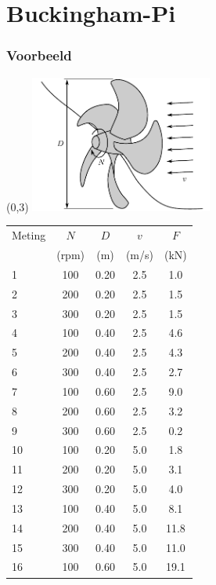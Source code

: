 \documentclass[t]{beamer}
\begin{document}
	\section{Buckingham-Pi}
	\begin{frame}
		\frametitle{Voorbeeld}
		\begin{textblock}{6}(0,3)
            \includegraphics[width=6cm]{../fig/gelijkvormigheid/Dimensieanalyse_voorbeeld_propellor}
        \end{textblock}
        \pause
		\hfill
		\tiny
		\begin{tabular}{lcccc}
			\hline
			Meting  & $N$   & $D$ & $v$   & $F$\\
			        & (rpm) & (m) & (m/s) & (kN)\\
			\hline                          
	        1 & 100 & 0.20 & 2.5 & 1.0 \\       
	        2 & 200 & 0.20 & 2.5 & 1.5 \\       
	        3 & 300 & 0.20 & 2.5 & 1.5 \\       
	        4 & 100 & 0.40 & 2.5 & 4.6 \\       
	        5 & 200 & 0.40 & 2.5 & 4.3 \\       
	        6 & 300 & 0.40 & 2.5 & 2.7 \\       
	        7 & 100 & 0.60 & 2.5 & 9.0 \\       
	        8 & 200 & 0.60 & 2.5 & 3.2 \\       
	        9 & 300 & 0.60 & 2.5 & 0.2 \\       
	        10 & 100 & 0.20 & 5.0 & 1.8 \\      
	        11 & 200 & 0.20 & 5.0 & 3.1 \\      
	        12 & 300 & 0.20 & 5.0 & 4.0 \\      
	        13 & 100 & 0.40 & 5.0 & 8.1 \\      
	        14 & 200 & 0.40 & 5.0 & 11.8 \\     
	        15 & 300 & 0.40 & 5.0 & 11.0 \\     
	        16 & 100 & 0.60 & 5.0 & 19.1 \\     

\end{tabular}
\end{frame}
\end{document}
